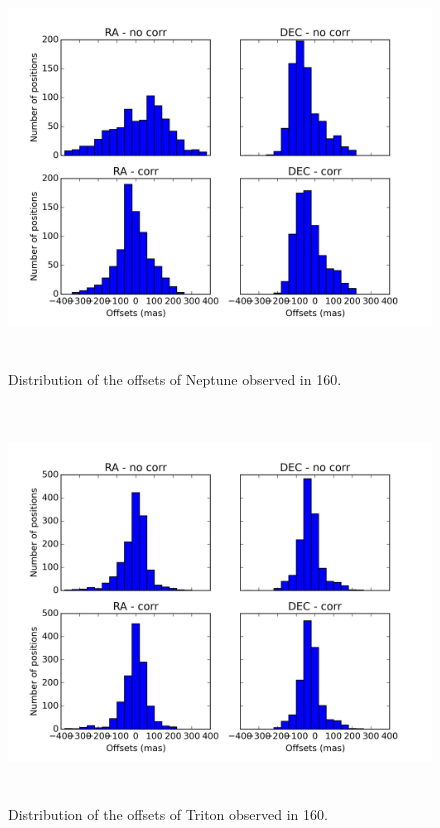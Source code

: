 \documentclass[12pt,a4paper]{report}
\begin{document}
\begin{figure}[H]
\centering
\includegraphics[height=10.5cm]{dist_Netuno_160.png} 
\caption{Distribution of the offsets of Neptune observed in 160.}
\label{Fig:refraction-net-160}
\end{figure}
\begin{figure}[H]
\centering
\includegraphics[height=10.5cm]{dist_Triton_160.png} 
\caption{Distribution of the offsets of Triton observed in 160.}
\label{Fig:refraction-tri-160}
\end{figure}
\end{document}
